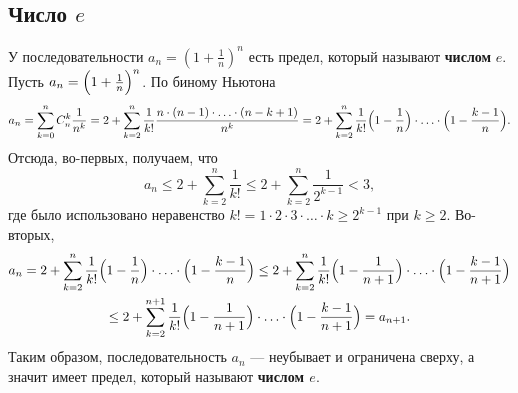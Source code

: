 \documentclass[12pt]{article}
\theoremstyle{definition}
\begin{document}
\subsection{Число $e$}
У последовательности $a_n = \left(1+\frac{1}{n}\right)^n$ есть предел, который называют \textbf{числом} $e$. \\ 
Пусть $a_n = \Bigl(1+\frac{1}{n}\Bigr)^{n}$.
По биному Ньютона
$$
a_n = \sum_{k=0}^{n}C_n^k \frac{1}{n^k}
= 2+\sum_{k=2}^{n}\frac{1}{k!}\frac{n\cdot (n-1)\cdot\ldots\cdot (n-k+1)}{n^k}
=2+\sum_{k=2}^{n}\frac{1}{k!}\Bigl(1-\frac{1}{n}\Bigr)\cdot\ldots\cdot\Bigl(1-\frac{k-1}{n}\Bigr).
$$
Отсюда, во-первых, получаем, что
$$
a_n\le2+\sum_{k=2}^{n}\frac{1}{k!}\le 2+\sum_{k=2}^{n}\frac{1}{2^{k-1}}< 3,
$$
где было использовано неравенство $k! = 1\cdot2\cdot3\cdot\ldots\cdot k \ge 2^{k-1}$
при $k\ge 2$.
Во-вторых,
\begin{multline*}
a_n=2+\sum_{k=2}^{n}\frac{1}{k!}\Bigl(1-\frac{1}{n}\Bigr)\cdot\ldots\cdot\Bigl(1-\frac{k-1}{n}\Bigr)
\le
2+\sum_{k=2}^{n}\frac{1}{k!}\Bigl(1-\frac{1}{n+1}\Bigr)\cdot\ldots\cdot\Bigl(1-\frac{k-1}{n+1}\Bigr)
\\
\le
2+\sum_{k=2}^{n+1}\frac{1}{k!}\Bigl(1-\frac{1}{n+1}\Bigr)\cdot\ldots\cdot\Bigl(1-\frac{k-1}{n+1}\Bigr)=a_{n+1}.
\end{multline*}
Таким образом, последовательность $a_n$ --- неубывает и ограничена сверху, а значит имеет предел,
который называют {\bf числом $e$}.
\end{document}
